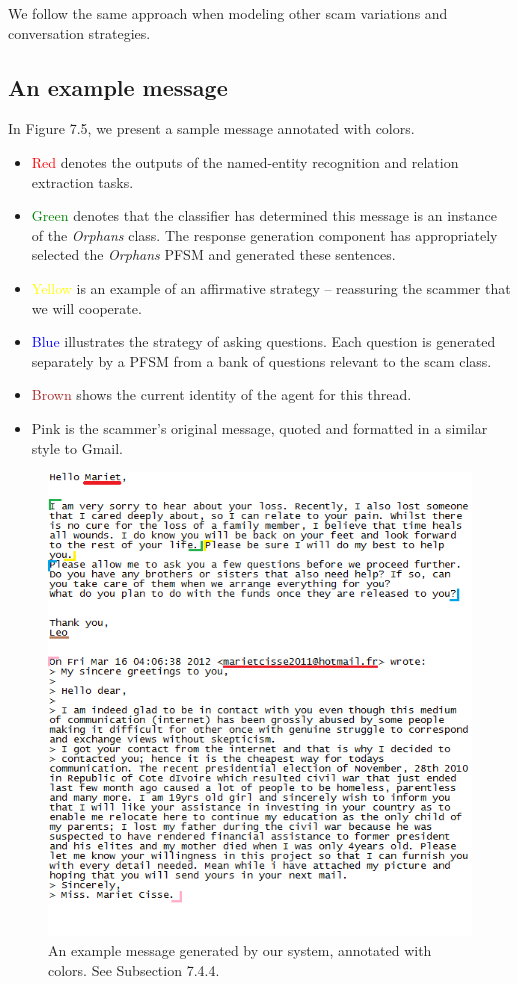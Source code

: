 We follow the same approach when modeling other scam variations and conversation strategies.

\clearpage
\subsection{An example message}
In Figure 7.5, we present a sample message annotated with colors.
\begin{itemize}
\item \textcolor{Red}{Red} denotes the outputs of the named-entity recognition and relation extraction tasks.
\item \textcolor{Green}{Green} denotes that the classifier has determined this message is an instance of the \textit{Orphans} class. The response generation component has appropriately selected the \textit{Orphans} PFSM and generated these sentences.
\item \textcolor{Yellow}{Yellow} is an example of an affirmative strategy -- reassuring the scammer that we will cooperate.
\item \textcolor{Blue}{Blue} illustrates the strategy of asking questions. Each question is generated separately by a PFSM from a bank of questions relevant to the scam class.
\item \textcolor{Brown}{Brown} shows the current identity of the agent for this thread.
\item \textcolor{CarnationPink}{Pink} is the scammer's original message, quoted and formatted in a similar style to Gmail.
\end{itemize}

\begin{figure}[h]
	\includegraphics{letter.png}
	\caption{An example message generated by our system, annotated with colors. See Subsection 7.4.4. }
\end{figure}

